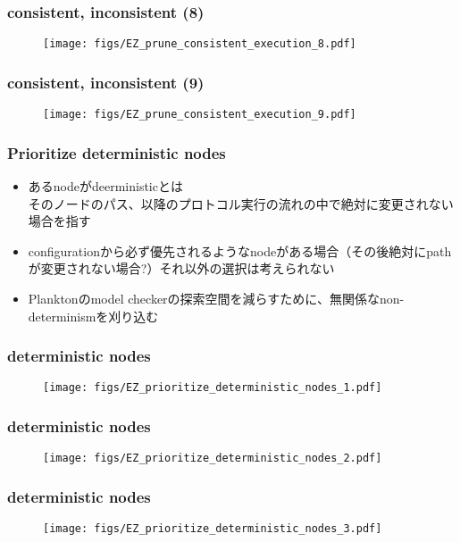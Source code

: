 \documentclass[dvipdfmx,9pt,notheorems]{beamer}
\theoremstyle{definition}
\begin{document}
\begin{frame}\frametitle{consistent, inconsistent (8)}
\begin{figure}[htb]
  \centering
	\texttt{[image: figs/EZ\_prune\_consistent\_execution\_8.pdf]}
\end{figure}%
\pnote{
}
\end{frame}

\begin{frame}\frametitle{consistent, inconsistent (9)}
\begin{figure}[htb]
  \centering
	\texttt{[image: figs/EZ\_prune\_consistent\_execution\_9.pdf]}
\end{figure}%
\pnote{
}
\end{frame}



\begin{frame}\frametitle{Prioritize deterministic nodes}
\begin{itemize}
	\item あるnodeがdeerministicとは\\
		そのノードのパス、以降のプロトコル実行の流れの中で絶対に変更されない場合を指す
	\item configurationから必ず優先されるようなnodeがある場合（その後絶対にpathが変更されない場合?）それ以外の選択は考えられない
	\item Planktonのmodel checkerの探索空間を減らすために、無関係なnon-determinismを刈り込む
\end{itemize}
\pnote{
}
\end{frame}

\begin{frame}\frametitle{deterministic nodes}
\begin{figure}[htb]
  \centering
	\texttt{[image: figs/EZ\_prioritize\_deterministic\_nodes\_1.pdf]}
\end{figure}%
\pnote{
}
\end{frame}

\begin{frame}\frametitle{deterministic nodes}
\begin{figure}[htb]
  \centering
	\texttt{[image: figs/EZ\_prioritize\_deterministic\_nodes\_2.pdf]}
\end{figure}%
\pnote{
}
\end{frame}

\begin{frame}\frametitle{deterministic nodes}
\begin{figure}[htb]
  \centering
	\texttt{[image: figs/EZ\_prioritize\_deterministic\_nodes\_3.pdf]}
\end{figure}%
\pnote{
}
\end{frame}
\end{document}
